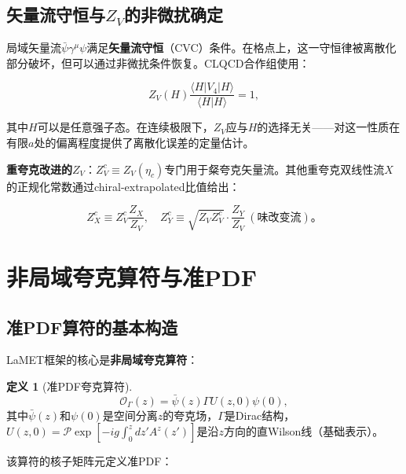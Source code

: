 \documentclass[12pt,a4paper]{ctexart}
\theoremstyle{definition}
\newtheorem{definition}{定义}[section]
\begin{document}
\subsection{矢量流守恒与$Z_V$的非微扰确定}

局域矢量流$\bar{\psi}\gamma^\mu\psi$满足\textbf{矢量流守恒}（CVC）条件。在格点上，这一守恒律被离散化部分破坏，但可以通过非微扰条件恢复。CLQCD合作组\cite{CLQCD2024charm}使用：

\begin{equation}
Z_V(H) \frac{\langle H|V_4|H\rangle}{\langle H|H\rangle} = 1,
\label{eq:ZV_CVC}
\end{equation}

其中$H$可以是任意强子态。在连续极限下，$Z_V$应与$H$的选择无关——对这一性质在有限$a$处的偏离程度提供了离散化误差的定量估计。

\textbf{重夸克改进的$Z_V$}\cite{CLQCD2024charm}：$Z^c_V \equiv Z_V(\eta_c)$专门用于粲夸克矢量流。其他重夸克双线性流$X$的正规化常数通过chiral-extrapolated比值给出：

\begin{equation}
Z^c_X \equiv Z^c_V \frac{Z_X}{Z_V}, \quad Z^c_Y \equiv \sqrt{Z_V Z^c_V} \cdot \frac{Z_Y}{Z_V} \ (\text{味改变流})。
\label{eq:heavy_improved_Z}
\end{equation}

\section{非局域夸克算符与准PDF}

\subsection{准PDF算符的基本构造}

LaMET框架的核心是\textbf{非局域夸克算符}\cite{Ji2013Euclidean,Liu2019isovector,Chen2016improved}：

\begin{definition}[准PDF夸克算符]
\begin{equation}
\boxed{\mathcal{O}_\Gamma(z) = \bar{\psi}(z) \Gamma U(z, 0) \psi(0)},
\label{eq:quasi_quark_op}
\end{equation}
其中$\bar{\psi}(z)$和$\psi(0)$是空间分离$z$的夸克场，$\Gamma$是Dirac结构，$U(z,0) = \mathcal{P}\exp[-ig\int_0^z dz' A^z(z')]$是沿$z$方向的直Wilson线（基础表示）。
\end{definition}

该算符的核子矩阵元定义准PDF\cite{Liu2019isovector}：
\end{document}
